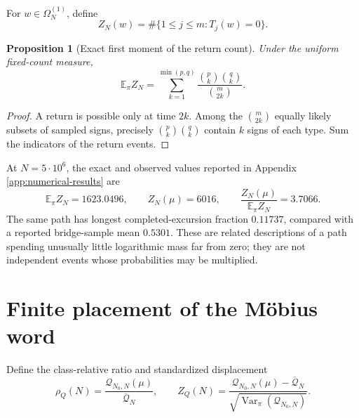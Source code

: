\documentclass[11pt,reqno]{amsart}
\numberwithin{equation}{section}
\theoremstyle{plain}
\newtheorem{proposition}[theorem]{Proposition}
\theoremstyle{definition}
\theoremstyle{remark}
\newcommand{\E}{\mathbb E}
\newcommand{\Var}{\operatorname{Var}}
\newcommand{\Om}{\Omega}
\newcommand{\QF}{\mathcal Q}
\begin{document}
For \(w\in\Om_N^{(1)}\), define
\begin{equation}
Z_N(w)=\#\{1\leq j\leq m:T_j(w)=0\}.
\label{eq:return-count}
\end{equation}

\begin{proposition}[Exact first moment of the return count]
\label{prop:exact-return-mean}
Under the uniform fixed-count measure,
\begin{equation}
\E_{\pi}Z_N
=\sum_{k=1}^{\min(p,q)}
\frac{\binom pk\binom qk}{\binom m{2k}}.
\label{eq:exact-return-mean}
\end{equation}
\end{proposition}

\begin{proof}
A return is possible only at time \(2k\).  Among the
\(\binom m{2k}\) equally likely subsets of sampled signs, precisely
\(\binom pk\binom qk\) contain \(k\) signs of each type.  Sum the indicators
of the return events.
\end{proof}

At \(N=5\cdot10^6\), the exact and observed values reported in Appendix
\ref{app:numerical-results} are
\begin{equation}
\E_{\pi}Z_N=1623.0496,\qquad
Z_N(\mu)=6016,\qquad
\frac{Z_N(\mu)}{\E_{\pi}Z_N}=3.7066.
\label{eq:five-million-return-excess}
\end{equation}
The same path has longest completed-excursion fraction \(0.11737\), compared
with a reported bridge-sample mean \(0.5301\).  These are related
descriptions of a path spending unusually little logarithmic mass far from
zero; they are not independent events whose probabilities may be
multiplied.

\section{Finite placement of the M\"obius word}
\label{sec:finite-placement}

Define the class-relative ratio and standardized displacement
\begin{equation}
\rho_Q(N)=\frac{\QF_{N_0,N}(\mu)}{\overline{\QF}_N},
\qquad
Z_Q(N)=\frac{\QF_{N_0,N}(\mu)-\overline{\QF}_N}
{\sqrt{\Var_{\pi}(\QF_{N_0,N})}}.
\label{eq:ratio-and-standardized-displacement}
\end{equation}
\end{document}
